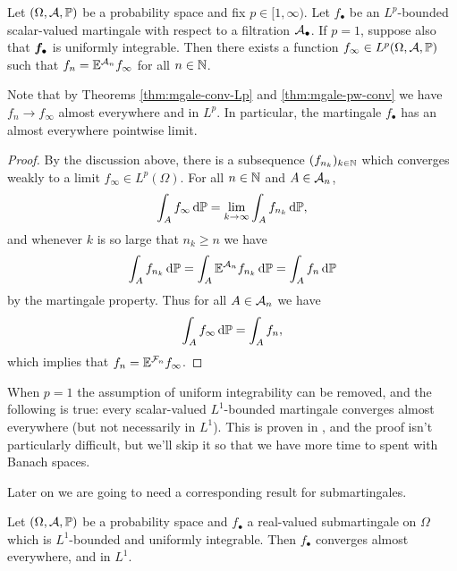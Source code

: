 \begin{thm}\label{thm:mgale-cv-repn}
  Let $(\Omega,\mathcal{A},\mathbb{P})$ be a probability space and fix $p \in [1,\infty)$.
  Let $f_{\bullet}$ be an $L^p$-bounded scalar-valued martingale with respect to a filtration $\mathcal{A}_{\bullet}$.
  If $p = 1$, suppose also that $\bm{f}_{\bullet}$ is uniformly integrable.
  Then there exists a function $f_\infty \in L^p(\Omega,\mathcal{A},\mathbb{P})$ such that $f_n = \mathbb{E}^{\mathcal{A}_n} f_\infty$ for all $n \in \mathbb{N}$.
\end{thm}

Note that by Theorems \ref{thm:mgale-conv-Lp} and \ref{thm:mgale-pw-conv} we have $f_n \to f_\infty$ almost everywhere and in $L^p$.
In particular, the martingale $f_{\bullet}$ has an almost everywhere pointwise limit.

\begin{proof}
  By the discussion above, there is a subsequence $(f_{n_k})_{k \in \mathbb{N}}$ which converges weakly to a limit $f_\infty \in L^p(\Omega)$.
  For all $n \in \mathbb{N}$ and $A \in \mathcal{A}_n$,
  \begin{equation*}
    \int_A f_\infty \, \mathrm{d}\mathbb{P} = \lim_{k \to \infty} \int_A f_{n_k} \, \mathrm{d}\mathbb{P},
  \end{equation*}
  and whenever $k$ is so large that $n_k \geq n$ we have
  \begin{equation*}
    \int_A f_{n_k} \, \mathrm{d}\mathbb{P} = \int_A \mathbb{E}^{\mathcal{A}_n} f_{n_k} \, \mathrm{d} \mathbb{P} = \int_A f_{n} \, \mathrm{d}\mathbb{P}
  \end{equation*}
  by the martingale property.
  Thus for all $A \in \mathcal{A}_n$ we have
  \begin{equation*}
    \int_A f_\infty \, \mathrm{d}\mathbb{P} = \int_A f_n,
  \end{equation*}
  which implies that $f_n = \mathbb{E}^{\mathcal{F}_n} f_\infty$.
\end{proof}

\begin{rmk}\label{rmk:mgale-cv-p1}
  When $p = 1$ the assumption of uniform integrability can be removed, and the following is true: every scalar-valued $L^1$-bounded martingale converges almost everywhere (but not necessarily in $L^1$).
  This is proven in \cite[Theorem 1.34]{gP16}, and the proof isn't particularly difficult, but we'll skip it so that we have more time to spent with Banach spaces.
\end{rmk}

Later on we are going to need a corresponding result for submartingales.

\begin{thm}\label{thm:submartingale-convergence}
  Let $(\Omega,\mathcal{A},\mathbb{P})$ be a probability space and $f_{\bullet}$ a real-valued submartingale on $\Omega$ which is $L^1$-bounded and uniformly integrable.
  Then $f_\bullet$ converges almost everywhere, and in $L^1$.
\end{thm}

